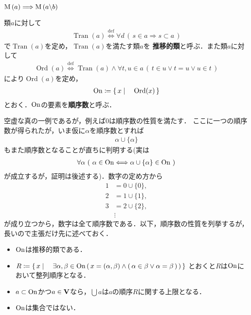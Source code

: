 	$\operatorname*{M}\left(a\right) \Longrightarrow \operatorname*{M}\left(a \backslash b\right)$
	
	\begin{screen}
		\begin{dfn}[順序数]
			類$a$に対して
			\begin{align}
				\operatorname{Tran}(a) \overset{\mathrm{def}}{\Longleftrightarrow}
				\forall d\, (\, s \in a \Longrightarrow s \subset a\, )
			\end{align}
			で$\operatorname{Tran}(a)$を定め，$\operatorname{Tran}(a)$を満たす類$a$を
			{\bf 推移的類}と呼ぶ．また類$a$に対して
			\begin{align}
				\operatorname{Ord}(a) \overset{\mathrm{def}}{\Longleftrightarrow}
				\operatorname{Tran}(a)
				\wedge \forall t,u \in a\, (\, t \in u \vee t = u \vee u \in t\, )
			\end{align}
			により$\operatorname{Ord}(a)$を定め，
			\begin{align}
				\mathrm{On} \coloneqq \left\{\, x \mid \quad \operatorname{Ord}(x)\, \right\}
			\end{align}
			とおく．$\mathrm{On}$の要素を{\bf 順序数}と呼ぶ．
		\end{dfn}
	\end{screen}
	
	空虚な真の一例であるが，例えば$0$は順序数の性質を満たす．
	ここに一つの順序数が得られたが，いま仮に$\alpha$を順序数とすれば
	\begin{align}
		\alpha \cup \{\alpha\}
	\end{align}
	もまた順序数となることが直ちに判明する(実は
	\begin{align}
		\forall \alpha\ (\ \alpha \in \mathrm{On} \Longleftrightarrow \alpha \cup \{\alpha\} \in \mathrm{On}\ )
	\end{align}
	が成立するが，証明は後述する)．数字の定め方から
	\begin{align}
		1 &= 0 \cup \{0\}, \\
		2 &= 1 \cup \{1\}, \\
		3 &= 2 \cup \{2\}, \\
		&\vdots
	\end{align}
	が成り立つから，数字は全て順序数である．以下，順序数の性質を列挙するが，長いので主張だけ先に述べておく．
	\begin{itemize}
		\item $\mathrm{On}$は推移的類である．
		\item $R \coloneqq \left\{\, x \mid \quad \exists \alpha,\beta \in \mathrm{On}\, 
			(\, x=(\alpha,\beta) \wedge (\, \alpha \in \beta \vee \alpha = \beta\, )\, )\, \right\}$
			とおくと$R$は$\mathrm{On}$において整列順序となる．
		\item $a \subset \mathrm{On}$かつ$a \in \mathbf{V}$なら，$\bigcup a$は$a$の順序$R$に関する上限となる．
		\item $\mathrm{On}$は集合ではない．
	\end{itemize}
	
